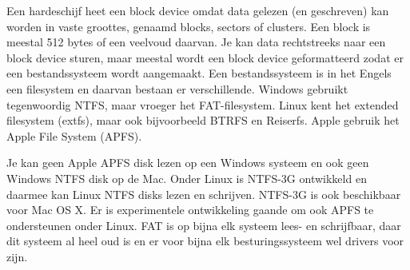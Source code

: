 Een hardeschijf heet een block device omdat data gelezen (en geschreven) kan worden in vaste groottes, genaamd blocks, sectors of clusters. Een block is meestal 512 bytes of een veelvoud daarvan. Je kan data rechtstreeks naar een block device sturen, maar meestal wordt een block device geformatteerd zodat er een bestandssysteem wordt aangemaakt. Een bestandssysteem is in het Engels een filesystem en daarvan bestaan er verschillende. Windows gebruikt tegenwoordig NTFS, maar vroeger het FAT-filesystem. Linux kent het extended filesystem (extfs), maar ook bijvoorbeeld BTRFS en Reiserfs. Apple gebruik het Apple File System (APFS).

Je kan geen Apple APFS disk lezen op een Windows systeem en ook geen Windows NTFS disk op de Mac. Onder Linux is NTFS-3G ontwikkeld en daarmee kan Linux NTFS disks lezen en schrijven. NTFS-3G is ook beschikbaar voor Mac OS X. Er is experimentele ontwikkeling gaande om ook APFS te ondersteunen onder Linux. FAT is op bijna elk systeem lees- en schrijfbaar, daar dit systeem al heel oud is en er voor bijna elk besturingssysteem wel drivers voor zijn.

